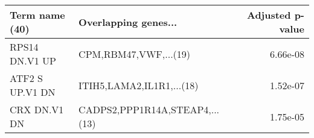 \begin{tabular}{llr}
\toprule
 Term name (40) &           Overlapping genes... &  Adjusted p-value \\
\midrule
 RPS14 DN.V1 UP &          CPM,RBM47,VWF,...(19) &          6.66e-08 \\
ATF2 S UP.V1 DN &      ITIH5,LAMA2,IL1R1,...(18) &          1.52e-07 \\
   CRX DN.V1 DN & CADPS2,PPP1R14A,STEAP4,...(13) &          1.75e-05 \\
\bottomrule
\end{tabular}
